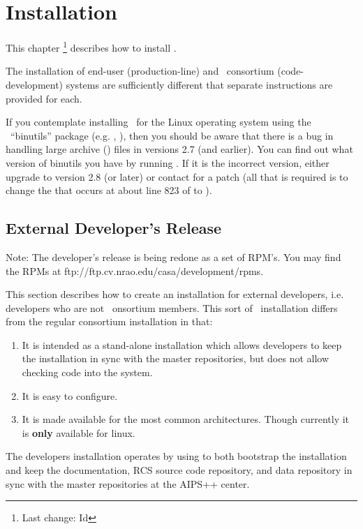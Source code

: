 \chapter{Installation}
\label{Installation}

This chapter \footnote{Last change:
$ $Id$ $}
describes how to install \aipspp.

The installation of end-user (production-line) and \aipspp\ consortium
(code-development) systems are sufficiently different that separate
instructions are provided for each.

If you contemplate installing \aipspp\ for the Linux operating system using
the \gnu\ ``binutils'' package (e.g. , ), then you should be
aware that there is a bug in handling large archive () files in
versions 2.7 (and earlier).  You can find out what version of binutils you
have by running .  If it is the incorrect version, either upgrade
to version 2.8 (or later) or contact  for a patch
(all that is required is to change the  that occurs at about line
823 of  to ).


\section{External Developer's Release}
\label{developers-release}

\begin{emph}
Note: The developer's release is being redone as a set of RPM's. You may find
the RPMs at 
{ftp://ftp.cv.nrao.edu/casa/development/rpms}.
\end{emph}

This section describes how to create an installation for external developers,
i.e. developers who are not \aipspp\ onsortium members. This sort
of \aipspp\ installation differs from the regular consortium
installation in that:
\begin{enumerate}
\item It is intended as a stand-alone installation which allows developers
      to keep the installation in sync with the master repositories, but
      does not allow checking code into the system.
\item It is easy to configure.
\item It is made available for the most common architectures. Though currently
      it is {\bf only} available for linux.
\end{enumerate}
The developers installation operates by using
 to
both bootstrap the installation and keep the documentation, RCS source code
repository, and data repository in sync with the master repositories at the
AIPS++ center.

